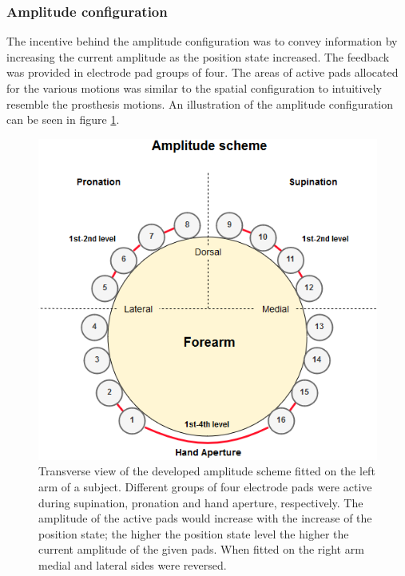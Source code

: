 \subsubsection{Amplitude configuration}
The incentive behind the amplitude configuration was to convey information by increasing the current amplitude as the position state increased. The feedback was provided in electrode pad groups of four.
The areas of active pads allocated for the various motions was similar to the spatial configuration to intuitively resemble the prosthesis motions. An illustration of the amplitude configuration can be seen in figure \ref{fig:pa:amplitude}. 
 \begin{figure}[h]                 
	\includegraphics[width=.9\textwidth]{figures/El_array_amplitude}  
	\caption{Transverse view of the developed amplitude scheme fitted on the left arm of a subject. Different groups of four electrode pads were active during supination, pronation and hand aperture, respectively. The amplitude of the active pads would increase with the increase of the position state; the higher the position state level the higher the current amplitude of the given pads. When fitted on the right arm medial and lateral sides were reversed.}
	\label{fig:pa:amplitude} 
\end{figure}

